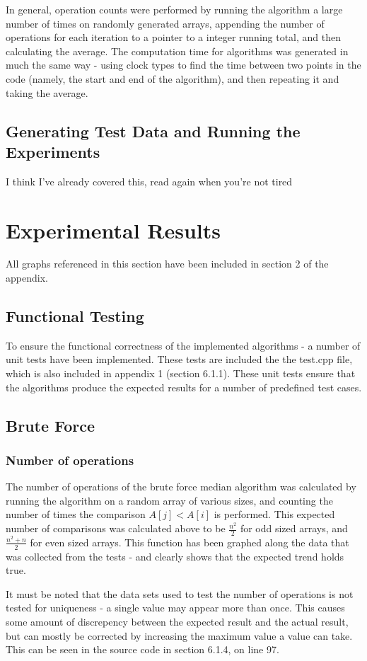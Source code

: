 \documentclass{article}
\begin{document}
        In general, operation counts were performed by running the algorithm a large number of times on randomly generated arrays, appending the number of operations for each iteration to a pointer to a integer running total, and then calculating the average. The computation time for algorithms was generated in much the same way - using clock types to find the time between two points in the code (namely, the start and end of the algorithm), and then repeating it and taking the average.
    \subsection{Generating Test Data and Running the Experiments}
        I think I've already covered this, read again when you're not tired
 
\section{Experimental Results}
    All graphs referenced in this section have been included in section 2 of the appendix.
    \subsection{Functional Testing}
        To ensure the functional correctness of the implemented algorithms - a number of unit tests have been implemented. These tests are included the the test.cpp file, which is also included in appendix 1 (section 6.1.1). These unit tests ensure that the algorithms produce the expected results for a number of predefined test cases.
    \subsection{Brute Force}
        \subsubsection{Number of operations}
            The number of operations of the brute force median algorithm was calculated by running the algorithm on a random array of various sizes, and counting the number of times the comparison $A[j] < A[i]$ is performed. This expected number of comparisons was calculated above to be $\frac{n^2}{2}$ for odd sized arrays, and $\frac{n^2 + n}{2}$ for even sized arrays. This function has been graphed along the data that was collected from the tests - and clearly shows that the expected trend holds true.

            It must be noted that the data sets used to test the number of operations is not tested for uniqueness - a single value may appear more than once. This causes some amount of discrepency between the expected result and the actual result, but can mostly be corrected by increasing the maximum value a value can take. This can be seen in the source code in section 6.1.4, on line 97.
\end{document}

